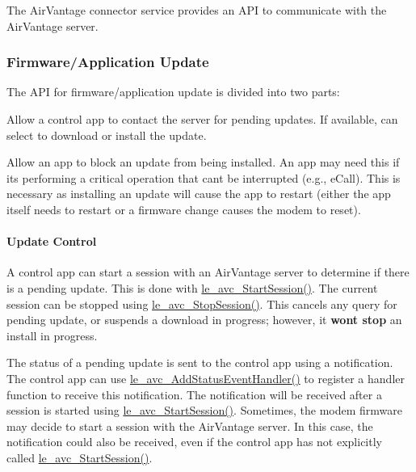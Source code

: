 The Air\+Vantage connector service provides an A\+P\+I to communicate with the Air\+Vantage server.\hypertarget{c_le_avc_c_le_avc_update}{}\subsubsection{Firmware/\+Application Update}\label{c_le_avc_c_le_avc_update}
The A\+P\+I for firmware/application update is divided into two parts\+:
\begin{DoxyItemize}
\item Allow a control app to contact the server for pending updates. If available, can select to download or install the update. ~\newline

\item Allow an app to block an update from being installed. An app may need this if it\textquotesingle{}s performing a critical operation that can\textquotesingle{}t be interrupted (e.\+g., e\+Call). This is necessary as installing an update will cause the app to restart (either the app itself needs to restart or a firmware change causes the modem to reset).
\end{DoxyItemize}\hypertarget{c_le_avc_c_le_avc_update_control}{}\paragraph{Update Control}\label{c_le_avc_c_le_avc_update_control}
A control app can start a session with an Air\+Vantage server to determine if there is a pending update. This is done with \hyperlink{le__avc__interface_8h_aee17b1de43cf946b59a965e6077e7b03}{le\+\_\+avc\+\_\+\+Start\+Session()}. The current session can be stopped using \hyperlink{le__avc__interface_8h_a5b3e21858181bb972e982046bced1182}{le\+\_\+avc\+\_\+\+Stop\+Session()}. This cancels any query for pending update, or suspends a download in progress; however, it {\bfseries won\textquotesingle{}t stop} an install in progress.

The status of a pending update is sent to the control app using a notification. The control app can use \hyperlink{le__avc__interface_8h_ac5443791a6e4b8db75342f45fa2f91dc}{le\+\_\+avc\+\_\+\+Add\+Status\+Event\+Handler()} to register a handler function to receive this notification. The notification will be received after a session is started using \hyperlink{le__avc__interface_8h_aee17b1de43cf946b59a965e6077e7b03}{le\+\_\+avc\+\_\+\+Start\+Session()}. Sometimes, the modem firmware may decide to start a session with the Air\+Vantage server. In this case, the notification could also be received, even if the control app has not explicitly called \hyperlink{le__avc__interface_8h_aee17b1de43cf946b59a965e6077e7b03}{le\+\_\+avc\+\_\+\+Start\+Session()}.

